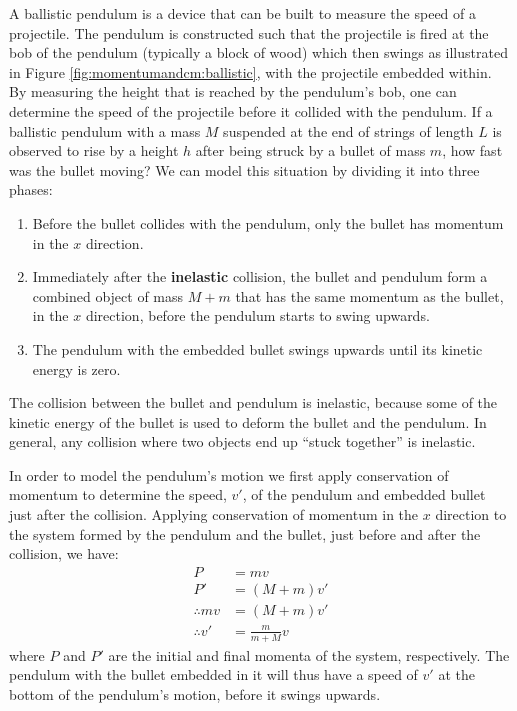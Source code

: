\begin{example}{
A ballistic pendulum is a device that can be built to measure the speed of a projectile. The pendulum is constructed such that the projectile is fired at the bob of the pendulum (typically a block of wood) which then swings as illustrated in Figure \ref{fig:momentumandcm:ballistic}, with the projectile embedded within. By measuring the height that is reached by the pendulum's bob, one can determine the speed of the projectile before it collided with the pendulum. If a ballistic pendulum with a mass $M$ suspended at the end of strings of length $L$ is observed to rise by a height $h$ after being struck by a bullet of mass $m$, how fast was the bullet moving?}
We can model this situation by dividing it into three phases:
\begin{enumerate}
\item Before the bullet collides with the pendulum, only the bullet has momentum in the $x$ direction.
\item Immediately after the \textbf{inelastic} collision, the bullet and pendulum form a combined object of mass $M+m$ that has the same momentum as the bullet, in the $x$ direction, before the pendulum starts to swing upwards.
\item The pendulum with the embedded bullet swings upwards until its kinetic energy is zero.
\end{enumerate}
The collision between the bullet and pendulum is inelastic, because some of the kinetic energy of the bullet is used to deform the bullet and the pendulum. In general, any collision where two objects end up ``stuck together'' is inelastic.

In order to model the pendulum's motion we first apply conservation of momentum to determine the speed, $v'$, of the pendulum and embedded bullet just after the collision. Applying conservation of momentum in the $x$ direction to the system formed by the pendulum and the bullet, just before and after the collision, we have:
\begin{align*}
P &= mv\\
P' &= (M+m)v'\\
\therefore mv &= (M+m)v'\\
\therefore v' &= \frac{m}{m+M}v
\end{align*}
where $P$ and $P'$ are the initial and final momenta of the system, respectively. The pendulum with the bullet embedded in it will thus have a speed of $v'$ at the bottom of the pendulum's motion, before it swings upwards. 


\end{example}
